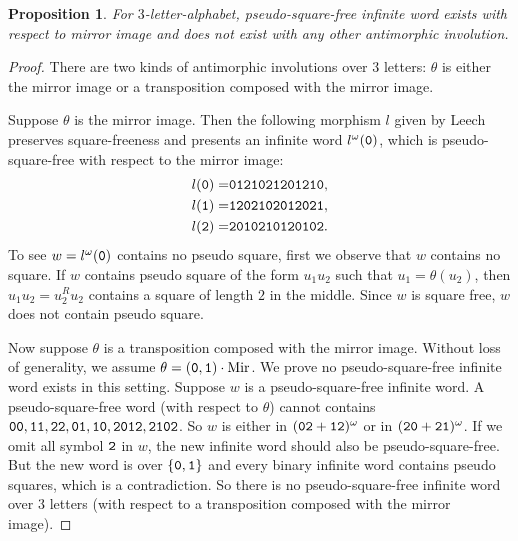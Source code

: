 \documentclass[12pt]{article}
\def\mirror{{\operatorname{Mir}}}
\def\mtt#1{{\tt #1}}
\newtheorem{proposition}[theorem]{Proposition}
\begin{document}
\begin{proposition}\label{prop:pseudoleech}
For $3$-letter-alphabet, pseudo-square-free infinite word exists
with respect to mirror image and does not exist with any other
antimorphic involution.
\end{proposition}
\begin{proof}
There are two kinds of antimorphic involutions over $3$ letters:
$\theta$ is either the mirror image or a transposition composed with
the mirror image.

Suppose $\theta$ is the mirror image. Then the following morphism
$l$ given by Leech \cite{Leech1957} preserves square-freeness and
presents an infinite word $l^\omega(\mtt0)$, which is
pseudo-square-free with respect to the mirror image:
\begin{align*}
l(\mtt0)=&\mtt0\mtt1\mtt2\mtt1\mtt0\mtt2\mtt1\mtt2\mtt0\mtt1\mtt2\mtt1\mtt0,\\
l(\mtt1)=&\mtt1\mtt2\mtt0\mtt2\mtt1\mtt0\mtt2\mtt0\mtt1\mtt2\mtt0\mtt2\mtt1,\\
l(\mtt2)=&\mtt2\mtt0\mtt1\mtt0\mtt2\mtt1\mtt0\mtt1\mtt2\mtt0\mtt1\mtt0\mtt2.
\end{align*}
To see $w=l^\omega(\mtt0)$ contains no pseudo square, first we
observe that $w$ contains no square. If $w$ contains pseudo square
of the form $u_1u_2$ such that $u_1=\theta(u_2)$, then
$u_1u_2=u_2^Ru_2$ contains a square of length $2$ in the middle.
Since $w$ is square free, $w$ does not contain pseudo square.

Now suppose $\theta$ is a transposition composed with the mirror
image. Without loss of generality, we assume
$\theta=(\mtt0,\mtt1)\cdot\mirror$. We prove no pseudo-square-free
infinite word exists in this setting. Suppose $w$ is a
pseudo-square-free infinite word. A pseudo-square-free word (with
respect to $\theta$) cannot contains $\mtt0\mtt0, \mtt1\mtt1,
\mtt2\mtt2, \mtt0\mtt1, \mtt1\mtt0, \mtt2\mtt0\mtt1\mtt2,
\mtt2\mtt1\mtt0\mtt2$. So $w$ is either in
$(\mtt0\mtt2+\mtt1\mtt2)^\omega$ or in
$(\mtt2\mtt0+\mtt2\mtt1)^\omega$. If we omit all symbol $\mtt2$ in
$w$, the new infinite word should also be pseudo-square-free. But
the new word is over $\{\mtt0,\mtt1\}$ and every binary infinite
word contains pseudo squares, which is a contradiction. So there is
no pseudo-square-free infinite word over $3$ letters (with respect
to a transposition composed with the mirror image).
\end{proof}
\end{document}
